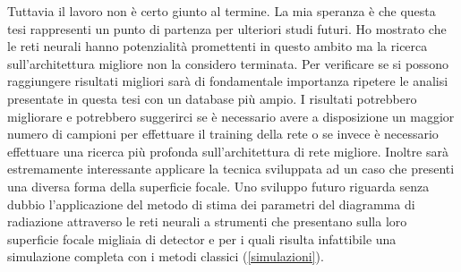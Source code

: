 \documentclass[12pt,a4paper,final]{book}
\begin{document}
Tuttavia il lavoro non è certo giunto al termine. La mia speranza è che questa tesi rappresenti un punto di partenza per ulteriori studi futuri. Ho mostrato che le reti neurali hanno potenzialità promettenti in questo ambito ma la ricerca sull'architettura migliore non la considero terminata. 
Per verificare se si possono raggiungere risultati migliori sarà di fondamentale importanza ripetere le analisi presentate in questa tesi con un database più ampio. I risultati potrebbero migliorare e potrebbero suggerirci se è necessario avere a disposizione un maggior numero di campioni  per effettuare il training della rete o se invece è necessario effettuare una ricerca più profonda sull'architettura di rete migliore.
Inoltre sarà estremamente interessante applicare la tecnica sviluppata ad un caso che presenti una diversa forma della superficie focale.
Uno sviluppo futuro riguarda senza dubbio l'applicazione del metodo di stima dei parametri del diagramma di radiazione attraverso le reti neurali a strumenti che presentano sulla loro superficie focale migliaia di detector e per i quali risulta infattibile una simulazione completa con i metodi classici (\ref{simulazioni}).



\nocite{*}
{}

\end{document}
